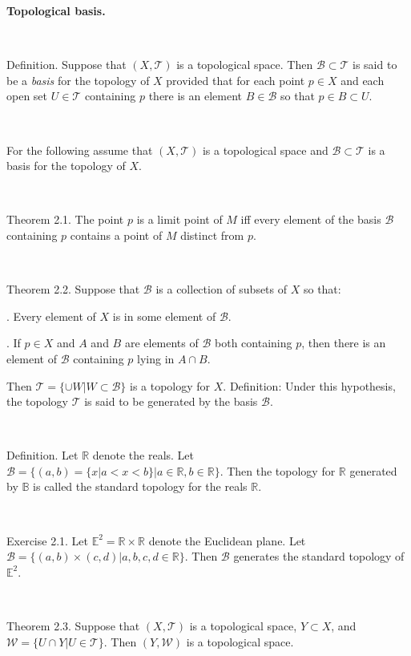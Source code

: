 \documentclass[12pt, std]{article}
\begin{document}
\begin{center} \textbf{Topological basis.} \end{center}

\

Definition.  Suppose that $(X, \mathcal{T})$ is a topological space.
Then $\mathcal{B} \subset \mathcal{T}$ is said to be a
\textit{basis} for the topology of $X$ provided that for each point
$p \in X$ and each open set $U \in \mathcal{T}$ containing $p$ there is an element
$B \in \mathcal{B}$ so that $ p \in B \subset U$.

\

For the following assume that $(X, \mathcal{T})$ is a topological
space and $\mathcal{B} \subset \mathcal{T}$ is a basis for the
topology of $X$.

\


Theorem 2.1.  The point $p$ is a limit point of $M$ iff every
element of the basis $\mathcal{B}$ containing $p$ contains a point of $M$ distinct
from $p$.

\

Theorem 2.2.  Suppose that $\mathcal{B}$ is a collection of subsets
of $X$ so that:

.  Every element of $X$ is in some element of $\mathcal{B}$.

.  If $p \in X$ and $A$ and $B$ are elements of
$\mathcal{B}$ both containing $p$, then there is an element of
$\mathcal{B}$ containing $p$ lying in $A \cap B$.

Then $\mathcal{T} = \{ \cup W | W \subset \mathcal{B} \}$ is a
topology for $X$.  Definition: Under this hypothesis, the topology
$\mathcal{T}$ is said to be generated by the basis $\mathcal{B}$.

\

Definition.  Let $\mathbb{R}$ denote the reals.  Let $\mathcal{B} =
\{ (a,b) = \{ x| a < x <b \} | a \in \mathbb{R}, b \in \mathbb{R}
\}$.  Then the topology for $\mathbb{R}$ generated by $\mathbb{B}$
is called the standard topology for the reals $\mathbb{R}$.

\

Exercise 2.1.  Let $ \mathbb{E}^2 = \mathbb{R} \times \mathbb{R}$
denote the Euclidean plane. Let $\mathcal{B} = \{ (a,b) \times (c,
d) | a, b, c, d \in \mathbb{R} \}$. Then $\mathcal{B}$ generates the standard topology of $ \mathbb{E}^2$.

\

Theorem 2.3.  Suppose that $(X, \mathcal{T})$ is a topological
space, $Y \subset X$, and $\mathcal{W} = \{ U \cap Y | U \in
\mathcal{T} \}$.  Then $(Y, \mathcal{W})$ is a topological space.
\end{document}
